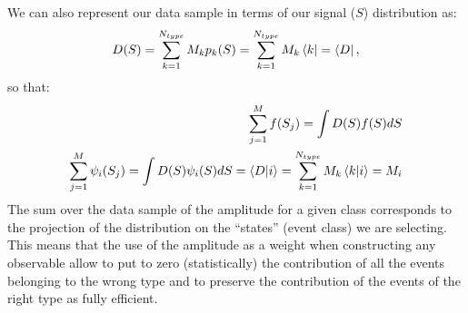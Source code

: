 We can also represent our data sample in terms of our signal ($S$)
distribution as:
\begin{equation}
\label{Sec1:DataSample}
D(S) = \sum\limits_{k=1}^{N_{type}} M_{k} p_{k}(S) = 
\sum\limits_{k=1}^{N_{type}}M_{k}\bra{k} = \bra{D},
\end{equation}
so that:
\begin{eqnarray}
\label{Sec1:Distribution}
\sum\limits_{j=1}^{M} f(S_j) = \int D(S) f(S) dS \\
\sum\limits_{j=1}^{M} \psi_{i}(S_j) = \int D(S) \psi_{i}(S) dS = \braket{D|i} = \sum\limits_{k=1}^{N_{type}}M_{k}\braket{k|i}=M_{i}
\end{eqnarray}
The sum over the data sample of the amplitude for a given class corresponds to
the projection of the distribution on the ``states'' (event class) we are
selecting. This means that the use of the amplitude as a weight when
constructing any observable allow to put to zero (statistically) the contribution of all the
events belonging to the wrong type and to preserve the contribution of the
events of the right type as fully efficient.
